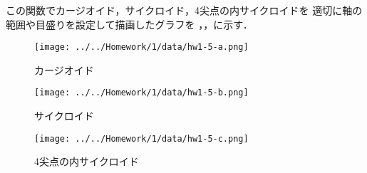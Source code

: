 

この関数でカージオイド，サイクロイド，4尖点の内サイクロイドを
適切に軸の範囲や目盛りを設定して描画したグラフを
，，に示す．

\begin{figure}[htbp]
	\centering
	\begin{minipage}[b]{0.32\textwidth}
		\centering
		\texttt{[image: ../../Homework/1/data/hw1-5-a.png]}
		\caption{カージオイド}
		\label{fig:hw1-5-a}
	\end{minipage}
	\begin{minipage}[b]{0.32\textwidth}
		\centering
		\texttt{[image: ../../Homework/1/data/hw1-5-b.png]}
		\caption{サイクロイド}
		\label{fig:hw1-5-b}
	\end{minipage}
	\begin{minipage}[b]{0.32\textwidth}
		\centering
		\texttt{[image: ../../Homework/1/data/hw1-5-c.png]}
		\caption{4尖点の内サイクロイド}
		\label{fig:hw1-5-c}
	\end{minipage}
\end{figure}
